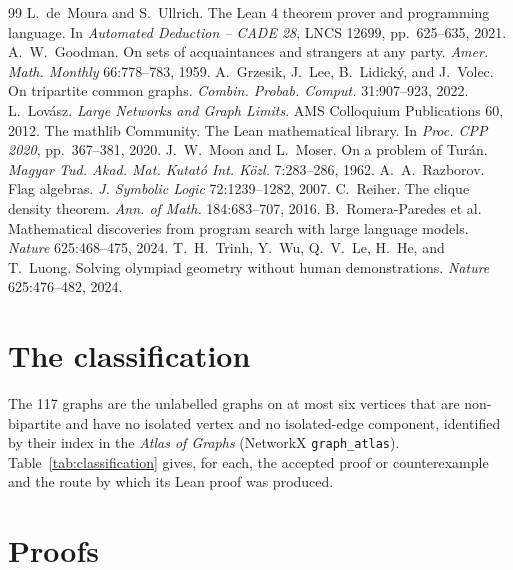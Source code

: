\documentclass[11pt,a4paper]{article}
\newcommand{\ttt}[1]{\texttt{#1}}
\begin{document}
\begin{thebibliography}{99}\small
{} L.~de~Moura and S.~Ullrich. The Lean 4 theorem prover and programming language. In
  \emph{Automated Deduction -- CADE 28}, LNCS 12699, pp.~625--635, 2021.
 A.~W.~Goodman. On sets of acquaintances and strangers at any party. \emph{Amer. Math.
  Monthly} 66:778--783, 1959.
 A.~Grzesik, J.~Lee, B.~Lidick\'y, and J.~Volec. On tripartite common graphs.
  \emph{Combin. Probab. Comput.} 31:907--923, 2022.
 L.~Lov\'asz. \emph{Large Networks and Graph Limits}. AMS Colloquium Publications 60, 2012.
 The mathlib Community. The Lean mathematical library. In \emph{Proc. CPP 2020},
  pp.~367--381, 2020.
 J.~W.~Moon and L.~Moser. On a problem of Tur\'an. \emph{Magyar Tud. Akad. Mat. Kutat\'o
  Int. K\"ozl.} 7:283--286, 1962.
 A.~A.~Razborov. Flag algebras. \emph{J. Symbolic Logic} 72:1239--1282, 2007.
 C.~Reiher. The clique density theorem. \emph{Ann. of Math.} 184:683--707, 2016.
 B.~Romera-Paredes et al. Mathematical discoveries from program search with large
  language models. \emph{Nature} 625:468--475, 2024.
 T.~H.~Trinh, Y.~Wu, Q.~V.~Le, H.~He, and T.~Luong. Solving olympiad geometry
  without human demonstrations. \emph{Nature} 625:476--482, 2024.
\end{thebibliography}

\appendix

\section{The classification}\label{app:classification}

The 117 graphs are the unlabelled graphs on at most six vertices that are non-bipartite and have no isolated
vertex and no isolated-edge component, identified by their index in the \emph{Atlas of Graphs} (NetworkX
\ttt{graph\_atlas}). Table~\ref{tab:classification} gives, for each, the accepted proof or counterexample and
the route by which its Lean proof was produced.



\section{Proofs}\label{app:proofs}
\end{document}
